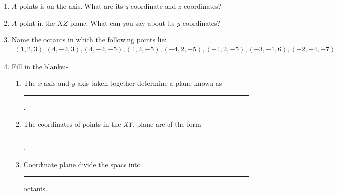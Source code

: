 \begin{enumerate}
\item $A$ points is on the axis. What are its $y$ coordinate and $z$ coordinates?
\item $A$ point  in the $XZ$-plane. What can you say about its $y$ coordinates?
\item Name the octants in which the  following points  lie:
\begin{align}
(1,2,3), (4,-2,3), (4,-2,-5), (4,2,-5), (-4,2,-5), (-4,2,-5), (-3,-1,6), (-2,-4,-7)
\end{align}
\item Fill in the blanks:- 
\begin{enumerate}[label=(\roman*)]
\item The $x$ axis and $y$ axis taken together determine a plane known as \rule{1cm}{0.15mm} .
\item The coordinates of points in the $XY$. plane are of the form \rule{1cm}{0.15mm}.
\item Coordinate plane divide the space into  \rule{1cm}{0.15mm} octants.
\end{enumerate}
\end{enumerate}

